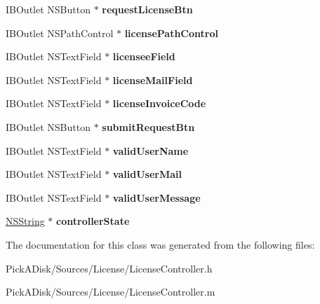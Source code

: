 \begin{DoxyCompactItemize}
\item 
\hypertarget{interface_license_controller_acf779f5fcbe702033902c43354f9dcec}{
IBOutlet NSButton $\ast$ {\bfseries requestLicenseBtn}}
\label{interface_license_controller_acf779f5fcbe702033902c43354f9dcec}

\item 
\hypertarget{interface_license_controller_a81c820ed66ea1e2a9a2d26e262588607}{
IBOutlet NSPathControl $\ast$ {\bfseries licensePathControl}}
\label{interface_license_controller_a81c820ed66ea1e2a9a2d26e262588607}

\item 
\hypertarget{interface_license_controller_a1271f0bea5e20a6b2effc0cfb9026f8d}{
IBOutlet NSTextField $\ast$ {\bfseries licenseeField}}
\label{interface_license_controller_a1271f0bea5e20a6b2effc0cfb9026f8d}

\item 
\hypertarget{interface_license_controller_a137db32ba25e7d01ea67c55be5277cd7}{
IBOutlet NSTextField $\ast$ {\bfseries licenseMailField}}
\label{interface_license_controller_a137db32ba25e7d01ea67c55be5277cd7}

\item 
\hypertarget{interface_license_controller_ae891e14745775481f51198ae74e0035e}{
IBOutlet NSTextField $\ast$ {\bfseries licenseInvoiceCode}}
\label{interface_license_controller_ae891e14745775481f51198ae74e0035e}

\item 
\hypertarget{interface_license_controller_a175d2efb347182534bb287444763752d}{
IBOutlet NSButton $\ast$ {\bfseries submitRequestBtn}}
\label{interface_license_controller_a175d2efb347182534bb287444763752d}

\item 
\hypertarget{interface_license_controller_a35381b891797fc586bba8350dce1e6b1}{
IBOutlet NSTextField $\ast$ {\bfseries validUserName}}
\label{interface_license_controller_a35381b891797fc586bba8350dce1e6b1}

\item 
\hypertarget{interface_license_controller_a0060a65c4f5b84c7cd40510a55b71473}{
IBOutlet NSTextField $\ast$ {\bfseries validUserMail}}
\label{interface_license_controller_a0060a65c4f5b84c7cd40510a55b71473}

\item 
\hypertarget{interface_license_controller_a4aa00aa8294869df51130a9e359360fc}{
IBOutlet NSTextField $\ast$ {\bfseries validUserMessage}}
\label{interface_license_controller_a4aa00aa8294869df51130a9e359360fc}

\item 
\hypertarget{interface_license_controller_a43c30441f9027fc1ca0b3ca6a8c57b4f}{
\hyperlink{class_n_s_string}{NSString} $\ast$ {\bfseries controllerState}}
\label{interface_license_controller_a43c30441f9027fc1ca0b3ca6a8c57b4f}

\end{DoxyCompactItemize}


The documentation for this class was generated from the following files:\begin{DoxyCompactItemize}
\item 
PickADisk/Sources/License/LicenseController.h\item 
PickADisk/Sources/License/LicenseController.m\end{DoxyCompactItemize}
